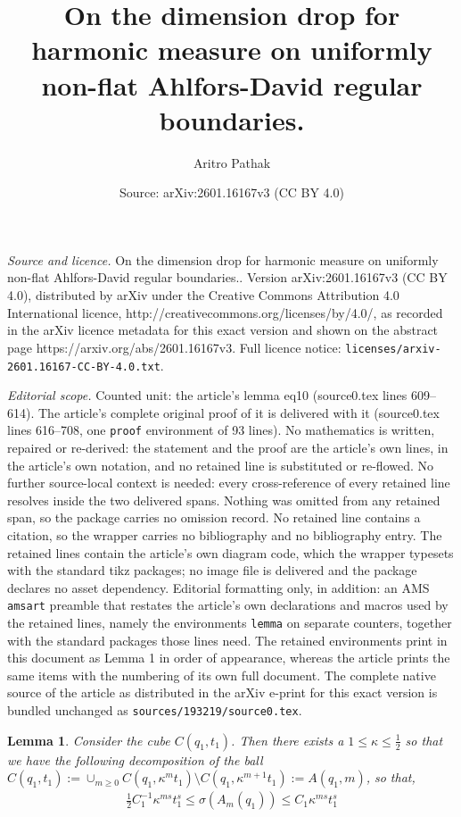 \documentclass[10pt,a4paper]{amsart}
\title{On the dimension drop for harmonic measure on uniformly non-flat Ahlfors-David regular boundaries.}
\author{Aritro Pathak}
\date{Source: arXiv:2601.16167v3 (CC BY 4.0)}
\newtheorem{lemma}{Lemma}
\begin{document}
\maketitle

\noindent\emph{Source and licence.} On the dimension drop for harmonic measure on uniformly non-flat Ahlfors-David regular boundaries.. Version arXiv:2601.16167v3 (CC BY 4.0), distributed by arXiv under the Creative Commons Attribution 4.0 International licence, http://creativecommons.org/licenses/by/4.0/, as recorded in the arXiv licence metadata for this exact version and shown on the abstract page https://arxiv.org/abs/2601.16167v3. Full licence notice: \texttt{licenses/arxiv-2601.16167-CC-BY-4.0.txt}.\par\smallskip

\noindent\textit{Editorial scope.} Counted unit: the article's lemma eq10 (source0.tex lines 609--614). The article's complete original proof of it is delivered with it (source0.tex lines 616--708, one \texttt{proof} environment of 93 lines). No mathematics is written, repaired or re-derived: the statement and the proof are the article's own lines, in the article's own notation, and no retained line is substituted or re-flowed.  No further source-local context is needed: every cross-reference of every retained line resolves inside the two delivered spans.  Nothing was omitted from any retained span, so the package carries no omission record.  No retained line contains a citation, so the wrapper carries no bibliography and no bibliography entry.  The retained lines contain the article's own diagram code, which the wrapper typesets with the standard tikz packages; no image file is delivered and the package declares no asset dependency.  Editorial formatting only, in addition: an AMS \texttt{amsart} preamble that restates the article's own declarations and macros used by the retained lines, namely the environments \texttt{lemma} on separate counters, together with the standard packages those lines need.  The retained environments print in this document as Lemma 1 in order of appearance, whereas the article prints the same items with the numbering of its own full document.  The complete native source of the article as distributed in the arXiv e-print for this exact version is bundled unchanged as \texttt{sources/193219/source0.tex}.
      \begin{lemma}
          Consider the cube $C(q_1,t_1)$. Then there exists a $1 \leq \kappa\leq \frac{1}{2}$ so that we have the following decomposition of the ball $C(q_1,t_1):=\cup_{m\geq 0}C(q_1,\kappa^m t_1)\setminus C(q_1,\kappa^{m+1}t_1) :=A(q_1,m)$, so that, 
        \begin{align}\label{eq10}
    \frac{1}{2}  C_{1}^{-1} \kappa^{ms}t_{1}^{s}\leq \sigma(A_m (q_1))\leq C_1 \kappa^{ms} t_{1}^s
\end{align}
      \end{lemma}
\end{document}
